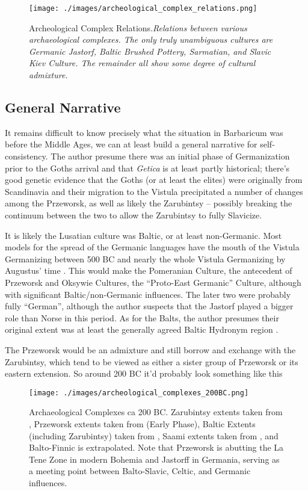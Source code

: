 \documentclass{article}
\begin{document}
	\begin{figure}[h]
		\centering
		\texttt{[image: ./images/archeological\_complex\_relations.png]}
		\caption{Archeological Complex Relations.\newline \small \textit{Relations between various archaeological complexes.
				The only truly unambiguous cultures are Germanic Jastorf, Baltic Brushed Pottery, Sarmatian, and Slavic Kiev Culture.
				The remainder all show some degree of cultural admixture.}}
	\end{figure}
	
	\subsection{General Narrative}
	It remains difficult to know precisely what the situation in Barbaricum was before the Middle Ages, we can at least build a general narrative for self-consistency.
	The author presume there was an initial phase of Germanization prior to the Goths arrival and that \textit{Getica} is at least partly historical; there’s good genetic evidence that the Goths (or at least the elites) were originally from Scandinavia and their migration to the Vistula precipitated a number of changes among the Przeworsk, as well as likely the Zarubintsy – possibly breaking the continuum between the two to allow the Zarubintsy to fully Slavicize.
	
	It is likely the Lusatian culture was Baltic, or at least non-Germanic.
	Most models for the spread of the Germanic languages have the mouth of the Vistula Germanizing between 500 BC and nearly the whole Vistula Germanizing by Augustus’ time \cite{HeatherEmpiresAndBarbarians}.
	This would make the Pomeranian Culture, the antecedent of Przeworsk and Oksywie Cultures, the “Proto-East Germanic” Culture, although with significant Baltic/non-Germanic influences.
	The later two were probably fully “German”, although the author suspects that the Jastorf played a bigger role than Norse in this period.
	As for the Balts, the author presumes their original extent was at least the generally agreed Baltic Hydronym region \cite{HeatherEmpiresAndBarbarians,BalticHydronyms}.
	
	The Przeworsk would be an admixture and still borrow and exchange with the Zarubintsy, which tend to be viewed as either a sister group of Przeworsk or its eastern extension. So around 200 BC it’d probably look something like this
	
	\begin{figure}[h!]
		\centering
		\texttt{[image: ./images/archeological\_complexes\_200BC.png]}
		\caption{Archaeological Complexes ca 200 BC.
		\tiny Zarubintsy extents taken from \cite{IndoEuroEncyclopedia}, Przeworsk extents taken from \cite{PrzeworskHistory} (Early Phase), Baltic Extents (including Zarubintsy) taken from \cite{BalticHydronyms}, Saami extents taken from \cite{LaplandSaami}, and Balto-Finnic is extrapolated.
		Note that Przeworsk is abutting the La Tene Zone in modern Bohemia and Jastorff in Germania, serving as a meeting point between Balto-Slavic, Celtic, and Germanic influences.}
	\end{figure}
	
\end{document}
